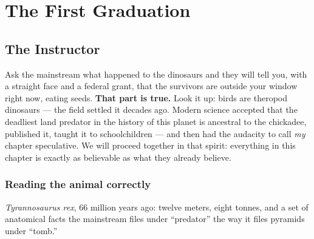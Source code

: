 \documentclass[
  english,
  11pt,
  letterpaper,
]{scrbook}
\begin{document}
\part{The First Graduation}

\chapter{The Instructor}\label{sec-instructor}

Ask the mainstream what happened to the dinosaurs and they will tell
you, with a straight face and a federal grant, that the survivors are
outside your window right now, eating seeds. \textbf{That part is true.}
Look it up: birds are theropod dinosaurs --- the field settled it
decades ago. Modern science accepted that the deadliest land predator in
the history of this planet is ancestral to the chickadee, published it,
taught it to schoolchildren --- and then had the audacity to call
\emph{my} chapter speculative. We will proceed together in that spirit:
everything in this chapter is exactly as believable as what they already
believe. 

\section{Reading the animal
correctly}\label{reading-the-animal-correctly}

\emph{Tyrannosaurus rex}, 66 million years ago: twelve meters, eight
tonnes, and a set of anatomical facts the mainstream files under
``predator'' the way it files pyramids under ``tomb.''
\end{document}
